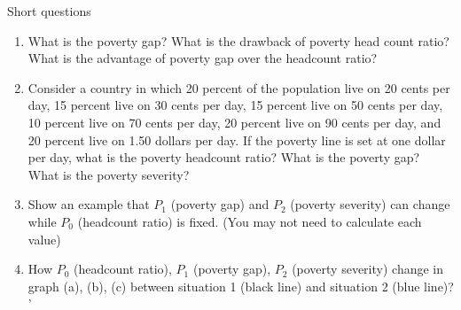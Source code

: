 \begin{homeworkProblem}{Short questions}

    \begin{enumerate}
        \item What is the poverty gap? What is the drawback of poverty head 
        count ratio? What is the advantage of poverty gap over the headcount 
        ratio?
        \item Consider a country in which 20 percent of the population live on 
        20 cents per day, 15 percent live on 30 cents per day, 15 percent live 
        on 50 cents per day, 10 percent live on 70 cents per day, 20 percent 
        live on 90 cents per day, and 20 percent live on 1.50 dollars per day. 
        If the poverty line is set at one dollar per day, what is the poverty 
        headcount ratio? What is the poverty gap? What is the poverty severity?
        \item Show an example that $P_1$ (poverty gap) and $P_2$ (poverty 
        severity) can change while $P_0$ (headcount ratio) is fixed. (You may 
        not need to calculate each value)
        \item How $P_0$ (headcount ratio), $P_1$ (poverty gap), $P_2$ (poverty 
        severity) change in graph (a), (b), (c) between situation 1 (black 
        line) and situation 2 (blue line)?
'    \end{enumerate}

    \begin{solution}
    

\end{solution}
\end{homeworkProblem}
